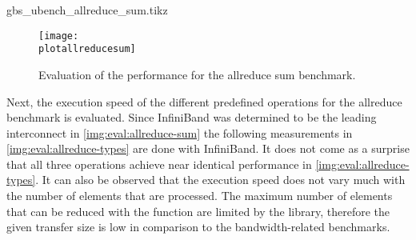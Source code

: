 \newcommand{\plotallreducesum}{gbs_ubench_allreduce_sum.tikz}
\begin{filecontents}{\plotallreducesum}

\newcommand{\csv}{gbs_ubench_allreduce_sum.csv}
\newcommand{\csvgi}{result-gi/\csv}
\newcommand{\csvte}{result-te/\csv}
\newcommand{\csvipoib}{result-ipoib/\csv}
\newcommand{\csvib}{result-ib/\csv}

\end{filecontents}

\begin{figure}[htb]
\centering
\texttt{[image: \\plotallreducesum]}
\caption{Evaluation of the performance for the allreduce sum benchmark.}
\label{img:eval:allreduce-sum}
\end{figure}


Next, the execution speed of the different predefined operations for the allreduce benchmark is evaluated. Since InfiniBand was determined to be the leading interconnect in \autoref{img:eval:allreduce-sum} the following measurements in \autoref{img:eval:allreduce-types} are done with InfiniBand. It does not come as a surprise that all three operations achieve near identical performance in \autoref{img:eval:allreduce-types}. It can also be observed that the execution speed does not vary much with the number of elements that are processed. The maximum number of elements that can be reduced with the function are limited by the library, therefore the given transfer size is low in comparison to the bandwidth-related benchmarks.

